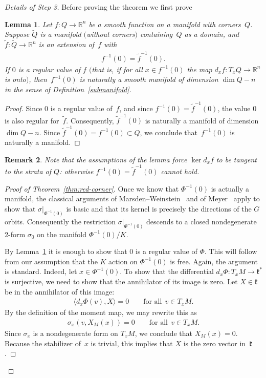 \documentclass[10pt,a4paper]{amsart}
\numberwithin{equation}{section}
\newtheorem{Lemma}{Lemma}[section]
\newtheorem{Remark}[Lemma]{Remark}
\begin{document}
\begin{proof}[Details of Step 3]
Before proving the theorem we f\/irst prove
\begin{Lemma}\label{lem2:28}
Let $f\colon Q\to {\mathbb R}^n$ be a smooth function on a manifold with corners~$Q$.
Suppose $\tilde{Q}$ is a manifold $($without corners$)$ containing~$Q$ as a domain,
and $\tilde{f}\colon \tilde{Q}\to {\mathbb R}^n$ is an extension of~$f$ with
\begin{gather*}
f^{-1} (0) = \tilde{f}^{-1} (0).
\end{gather*}
If $0$ is a regular value of $f$ $($that is, if for all $x\in f^{-1} (0)$
the map $d_x f\colon T_xQ\to {\mathbb R}^n$ is onto$)$, then~$f^{-1} (0)$ is naturally
a smooth manifold of dimension $\dim Q-n$
in the sense of Definition~{\rm \ref{submanifold}}.
\end{Lemma}

\begin{proof}
Since $0$ is a regular value of~$f$, and since $f^{-1} (0) = \tilde{f}^{-1} (0)$,
the value $0$ is also regular for~$\tilde{f}$.  Consequently,
$\tilde{f}^{-1} (0)$ is naturally a manifold of dimension $\dim Q - n$.
Since $\tilde{f}^{-1} (0) = f^{-1} (0)\subset Q$, we conclude
that~$f^{-1} (0)$ is naturally a manifold.
\end{proof}

\begin{Remark}
  Note that the assumptions of the lemma force $\ker d_x f$ to be
  tangent to the strata of $Q$: otherwise $f^{-1} (0) = \tilde{f}^{-1}
  (0)$ cannot hold.
\end{Remark}

\begin{proof}[Proof of Theorem~\ref{thm:red-corner}]
  Once we know that $\Phi^{-1} (0)$ is actually a manifold, the
  classical arguments of Marsden--Weinstein~\cite{MW} and of Meyer~\cite{Meyer} apply to show that $\sigma|_{\Phi^{-1} (0)}$ is basic and
  that its kernel is precisely the directions of the $G$ orbits.
  Consequently the restriction $\sigma|_{\Phi^{-1} (0)}$ descends to a
  closed nondegenerate 2-form $\sigma_0$ on the manifold $\Phi^{-1}
  (0)/K$.

  By Lemma~\ref{lem2:28} it is enough to show that 0 is a regular
  value of $\Phi$. This will follow from our assumption that the $K$
  action on $\Phi^{-1} (0)$ is free. Again, the argument is
  standard. Indeed, let $x \in \Phi^{-1} (0)$.  To show that the
  dif\/ferential $d_x \Phi\colon  T_xM \to {\mathfrak k}^*$ is surjective, we need to
  show that the annihilator of its image is zero.  Let $X \in {\mathfrak k}$ be
  in the annihilator of this image:
\begin{gather*}
\langle d_x \Phi (v), X\rangle = 0
      \qquad  \textrm{for all} \ \ v\in T_x M  .
\end{gather*}
By the def\/inition of the moment map, we may rewrite this as
\begin{gather*}
     \sigma_x(v,X_M(x)) = 0 \qquad \text{for all} \ \ v \in T_xM .
\end{gather*}
Since $\sigma_x$ is a nondegenerate form on $T_xM$,
we conclude that $X_M(x) = 0$.
Because the stabilizer of~$x$ is trivial, this implies
that $X$ is the zero vector in~${\mathfrak k}$.
\end{proof}


\end{proof}
\end{document}
